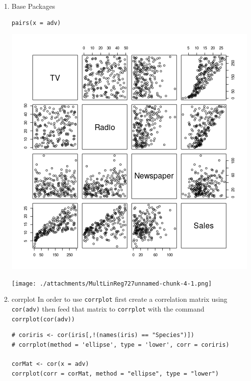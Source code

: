 \documentclass[11pt]{article}
\begin{document}
\begin{enumerate}
\item Base Packages
\label{sec:orgd8baea4}
\begin{verbatim}
pairs(x = adv)
\end{verbatim}

\begin{center}
\includegraphics[width=.9\linewidth]{AdvCorPlotMultLinReg.png}
\end{center}

\begin{center}
\texttt{[image: ./attachments/MultLinReg727unnamed-chunk-4-1.png]}
\end{center}

\item corrplot
\label{sec:org4e7e442}
In order to use \texttt{corrplot} first create a correlation matrix using
\texttt{cor(adv)} then feed that matrix to \texttt{corrplot} with the command
\texttt{corrplot(cor(adv))}

\begin{verbatim}
# coriris <- cor(iris[,!(names(iris) == "Species")])
# corrplot(method = 'ellipse', type = 'lower', corr = coriris)

corMat <- cor(x = adv)
corrplot(corr = corMat, method = "ellipse", type = "lower")
\end{verbatim}


\end{enumerate}
\end{document}
